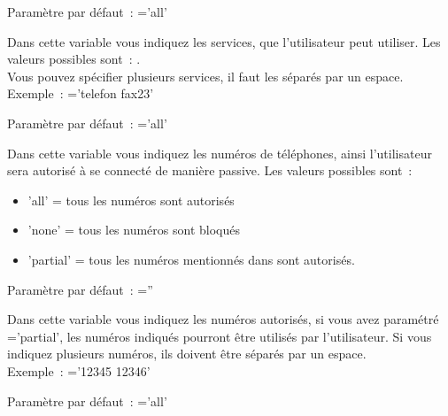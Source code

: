 \begin{description}

        Paramètre par défaut~: ='all'

        Dans cette variable vous indiquez les services, que l'utilisateur peut utiliser. 
		Les valeurs possibles sont~: . \\
        Vous pouvez spécifier plusieurs services, il faut les séparés par un espace. \\
        Exemple~: ='telefon fax23'


        Paramètre par défaut~: ='all'

        Dans cette variable vous indiquez les numéros de téléphones, ainsi l'utilisateur sera
		autorisé à se connecté de manière passive.
		Les valeurs possibles sont~:
        \begin{itemize}
            \item 'all' = tous les numéros sont autorisés
            \item 'none' = tous les numéros sont bloqués
            \item 'partial' = tous les numéros mentionnés dans
                sont autorisés.
        \end{itemize}


        Paramètre par défaut~: =''

        Dans cette variable vous indiquez les numéros autorisés, si vous avez paramétré
		='partial', les numéros indiqués pourront être
		utilisés par l'utilisateur.
		Si vous indiquez plusieurs numéros, ils doivent être séparés par un espace. \\
		Exemple~: ='12345 12346'


        Paramètre par défaut~: ='all'


\end{description}
